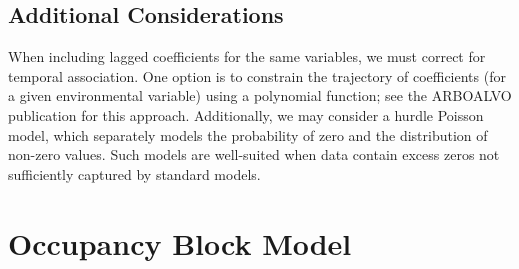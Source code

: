 \documentclass[12pt,a4paper]{article}
\begin{document}
\begin{table}[ht]
\centering
\small
{}
\caption{Summary comparison of AIC, WAIC, and LOOIC.}
\label{tab:model_criteria}
\end{table}

\subsection{Additional Considerations}

When including lagged coefficients for the same variables, we must correct for temporal association. One option is to constrain the trajectory of coefficients (for a given environmental variable) using a polynomial function; see the ARBOALVO publication for this approach. Additionally, we may consider a hurdle Poisson model, which separately models the probability of zero and the distribution of non-zero values. Such models are well-suited when data contain excess zeros not sufficiently captured by standard models.

\section{Occupancy Block Model}
\label{sec:occupancy}
\end{document}
